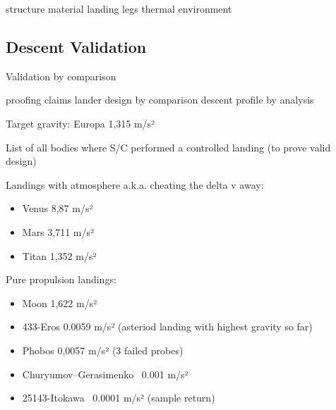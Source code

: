 	structure
	material
	landing legs
thermal environment


\subsection{Descent Validation}

Validation by comparison 

proofing claims
	lander design by comparison
	descent profile by analysis


Target gravity: Europa 1,315 m/s²

List of all bodies where S/C performed a controlled landing (to prove valid design)

Landings with atmosphere a.k.a. cheating the  delta v away:
\begin{itemize}  
\item Venus 8,87 m/s²
\item Mars 3,711 m/s²
\item Titan 1,352 m/s²
\end{itemize}

Pure propulsion landings:
\begin{itemize}
\item Moon 1,622 m/s²
\item 433-Eros 0.0059 m/s² (asteriod landing with highest gravity so far)
\item Phobos 0,0057 m/s² (3 failed probes)
\item Churyumov–Gerasimenko ~0.001 m/s²
\item 25143-Itokawa ~0.0001 m/s² (sample return)
\end{itemize}

